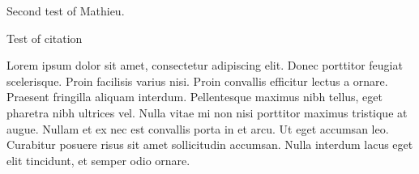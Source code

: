 Second test of Mathieu.

Test of citation \cite{Biedermann:2016yds}

Lorem ipsum dolor sit amet, 
consectetur adipiscing elit. 
Donec porttitor feugiat scelerisque. 
Proin facilisis varius nisi. 
Proin convallis efficitur lectus a ornare. 
Praesent fringilla aliquam interdum. 
Pellentesque maximus nibh tellus, eget pharetra nibh ultrices vel. 
Nulla vitae mi non nisi porttitor maximus tristique at augue. 
Nullam et ex nec est convallis porta in et arcu. 
Ut eget accumsan leo. 
Curabitur posuere risus sit amet sollicitudin accumsan. 
Nulla interdum lacus eget elit tincidunt, et semper odio ornare.

